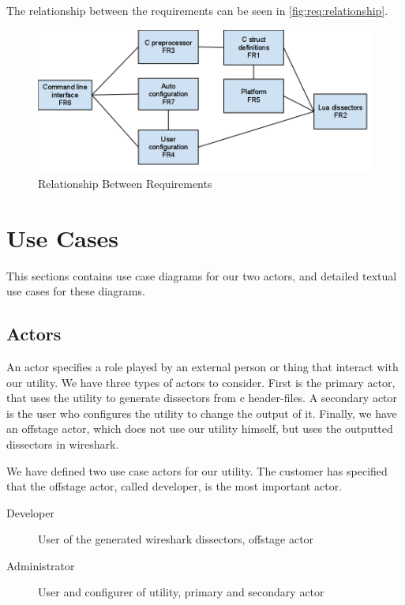 The relationship between the requirements can be seen in \autoref{fig:req:relationship}.

\begin{figure}[htbp]
	\center
	\includegraphics[width=\textwidth]{./planning/img/requirement_relationship}
	\caption{Relationship Between Requirements\label{fig:req:relationship}}
\end{figure}


\section{Use Cases}
\label{sec:req:usecases}
This sections contains use case diagrams for our two actors, and detailed
textual use cases for these diagrams.

\subsection{Actors}
An actor specifies a role played by an external person or thing that interact
with our \gls{utility}. We have three types of actors to consider. First is the
primary actor, that uses the \gls{utility} to generate \glspl{dissector} from 
\Gls{c} header-files. A secondary actor is the user who configures the
\gls{utility} to change the output of it. Finally, we have an offstage actor, which
does not use our \gls{utility} himself, but uses the outputted \glspl{dissector} in \Gls{wireshark}.

We have defined two use case actors for our \gls{utility}. The customer has specified
that the offstage actor, called developer, is the most important actor.
\begin{description}
	\item[Developer] User of the generated \Gls{wireshark} \glspl{dissector}, offstage actor
	\item[Administrator] User and configurer of \gls{utility}, primary and secondary actor
\end{description}

